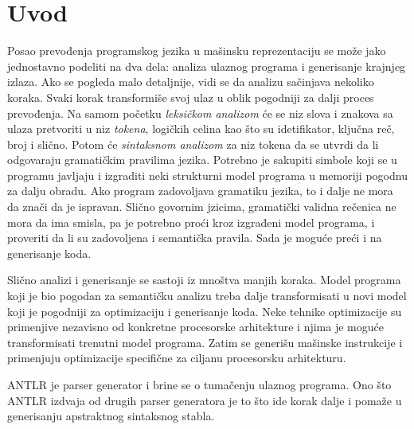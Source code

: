 \chapter{Uvod}

Posao prevođenja programskog jezika u mašinsku reprezentaciju se može jako jednostavno podeliti na dva dela: analiza ulaznog programa i generisanje krajnjeg izlaza\cite{dragon}. 
Ako se pogleda malo detaljnije, vidi se da analizu sačinjava nekoliko koraka. 
Svaki korak transformiše svoj ulaz u oblik pogodniji za dalji proces prevođenja. 
Na samom početku \emph{leksičkom analizom} će se niz slova i znakova sa ulaza pretvoriti u niz \emph{tokena}, logičkih celina kao što su idetifikator, ključna reč, broj i slično. 
Potom će \emph{sintaksnom analizom} za niz tokena da se utvrdi da li odgovaraju gramatičkim pravilima jezika. 
Potrebno je sakupiti simbole koji se u programu javljaju i izgraditi neki strukturni model programa u memoriji pogodnu za dalju obradu. 
Ako program zadovoljava gramatiku jezika, to i dalje ne mora da znači da je ispravan. 
Slično govornim jzicima, gramatički validna rečenica ne mora da ima smisla, pa je potrebno proći kroz izgrađeni model programa, i proveriti da li su zadovoljena i semantička pravila. 
Sada je moguće preći i na generisanje koda.

Slično analizi i generisanje se sastoji iz mnoštva manjih koraka. 
Model programa koji je bio pogodan za semantičku analizu treba dalje transformisati u novi model koji je pogodniji za optimizaciju i generisanje koda. 
Neke tehnike optimizacije su primenjive nezavisno od konkretne procesorske arhitekture i njima je moguće transformisati trenutni model programa. 
Zatim se generišu mašinske instrukcije i primenjuju optimizacije specifične za ciljanu procesorsku arhitekturu.

ANTLR je parser generator i brine se o tumačenju ulaznog programa. Ono što ANTLR izdvaja od drugih parser generatora je to što ide korak dalje i pomaže u generisanju apstraktnog sintaksnog stabla.

